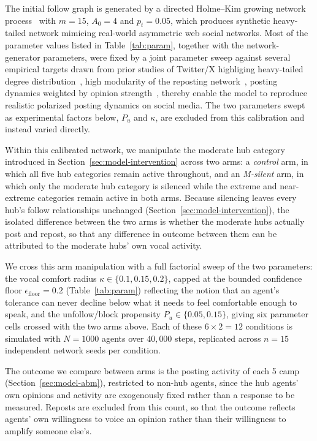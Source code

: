 \documentclass{svproc}
\def\BoundedConfidence{\epsilon} %
\def\VCR{\kappa}                 %
\begin{document}
The initial follow graph is generated by a directed
Holme--Kim growing network process~\cite{holme2002} 
with $m=15$, $A_0=4$ 
and $p_t=0.05$, which produces 
synthetic heavy-tailed network mimicing real-world 
asymmetric web social networks.
Most of the parameter values listed in
Table~\ref{tab:param}, together with the
network-generator parameters, were 
fixed by a joint parameter
sweep against several empirical targets drawn from
prior studies of Twitter/X
highliging heavy-tailed degree distribution~\cite{kwak2010}, 
high modularity of the reposting network~\cite{conover2011}, 
posting dynamics weighted by opinion strength~\cite{buntain2025}, 
thereby enable the model to reproduce realistic polarized posting dynamics
on social media. 
The two
parameters swept as experimental factors below,
$P_u$ and $\VCR$, are excluded from this
calibration and instead varied directly.

Within this calibrated network, 
we manipulate the moderate hub category
introduced in Section~\ref{sec:model-intervention}
across two arms: a \emph{control} arm, in which
all five hub categories remain active throughout,
and an \emph{M-silent} arm, in which only the
moderate hub category is silenced while the
extreme and near-extreme categories remain active
in both arms. Because silencing leaves every
hub's follow relationships unchanged
(Section~\ref{sec:model-intervention}), the isolated
difference between the two arms is whether the
moderate hubs actually post and repost, so that
any difference in outcome between them can be
attributed to the moderate hubs' own vocal
activity.

We cross this arm manipulation with a full
factorial sweep of the two parameters: the
vocal comfort radius $\VCR\in\{0.1,0.15,0.2\}$,
capped at the bounded confidence floor
$\BoundedConfidence_{\mathrm{floor}}=0.2$
(Table~\ref{tab:param}) reflecting the notion that 
an agent's
tolerance can never decline below what it needs
to feel comfortable enough to speak, and
the unfollow/block propensity $P_u\in\{0.05,0.15\}$,
giving six parameter cells crossed with the two
arms above. Each of these $6\times2=12$ conditions
is simulated with $N=1000$ agents over $40{,}000$
steps, replicated across $n=15$ independent
network seeds per condition.

The outcome we compare between arms is the
posting activity of each 5 camp
(Section~\ref{sec:model-abm}), restricted to
non-hub agents, since the hub agents' own opinions
and activity are exogenously fixed rather than a
response to be measured.
Reposts are excluded from this
count, so that the outcome reflects agents' own
willingness to voice an opinion rather than their
willingness to amplify someone else's.
\end{document}
